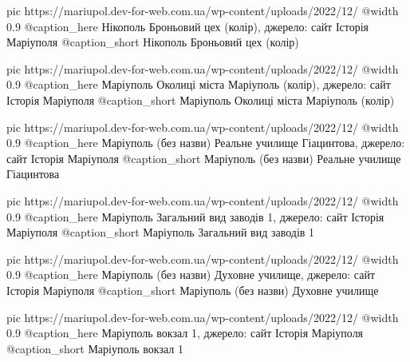   pic https://mariupol.dev-for-web.com.ua/wp-content/uploads/2022/12/%
  @width 0.9
  @caption_here Нікополь Броньовий цех (колір), джерело: сайт Історія Маріуполя
  @caption_short Нікополь Броньовий цех (колір)

  pic https://mariupol.dev-for-web.com.ua/wp-content/uploads/2022/12/%
  @width 0.9
  @caption_here Маріуполь Околиці міста Маріуполь (колір), джерело: сайт Історія Маріуполя
  @caption_short Маріуполь Околиці міста Маріуполь (колір)

  pic https://mariupol.dev-for-web.com.ua/wp-content/uploads/2022/12/%
  @width 0.9
  @caption_here Маріуполь (без назви) Реальне училище Гіацинтова, джерело: сайт Історія Маріуполя
  @caption_short Маріуполь (без назви) Реальне училище Гіацинтова

  pic https://mariupol.dev-for-web.com.ua/wp-content/uploads/2022/12/%
  @width 0.9
  @caption_here Маріуполь Загальний вид заводів 1, джерело: сайт Історія Маріуполя
  @caption_short Маріуполь Загальний вид заводів 1

  pic https://mariupol.dev-for-web.com.ua/wp-content/uploads/2022/12/%
  @width 0.9
  @caption_here Маріуполь (без назви) Духовне училище, джерело: сайт Історія Маріуполя
  @caption_short Маріуполь (без назви) Духовне училище

  pic https://mariupol.dev-for-web.com.ua/wp-content/uploads/2022/12/%
  @width 0.9
  @caption_here Маріуполь вокзал 1, джерело: сайт Історія Маріуполя
  @caption_short Маріуполь вокзал 1

